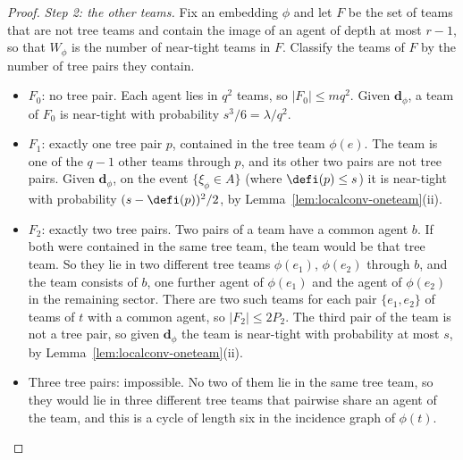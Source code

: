 \begin{proof}
\emph{Step 2: the other teams.} Fix an embedding $\phi$ and let $F$ be the set of teams that
are not tree teams and contain the image of an agent of depth at most $r-1$, so that
$W_\phi$ is the number of near-tight teams in $F$. Classify the teams of $F$ by the number of
tree pairs they contain.
\begin{itemize}
\item $F_0$: no tree pair. Each agent lies in $q^2$ teams, so $|F_0|\le mq^2$. Given
$\mathbf d_\phi$, a team of $F_0$ is near-tight with probability $s^3/6=\lambda/q^2$.
\item $F_1$: exactly one tree pair $p$, contained in the tree team $\phi(e)$. The team is one
of the $q-1$ other teams through $p$, and its other two pairs are not tree pairs. Given
$\mathbf d_\phi$, on the event $\{\xi_\phi\in A\}$ (where $\defi(p)\le s$) it is near-tight
with probability $(s-\defi(p))^2/2$, by Lemma~\ref{lem:localconv-oneteam}(ii).
\item $F_2$: exactly two tree pairs. Two pairs of a team have a common agent $b$. If both
were contained in the same tree team, the team would be that tree team. So they lie in two
different tree teams $\phi(e_1)$, $\phi(e_2)$ through $b$, and the team consists of $b$, one
further agent of $\phi(e_1)$ and the agent of $\phi(e_2)$ in the remaining sector. There are
two such teams for each pair $\{e_1,e_2\}$ of teams of $t$ with a common agent, so
$|F_2|\le2P_2$. The third pair of the team is not a tree pair, so given $\mathbf d_\phi$ the
team is near-tight with probability at most $s$, by Lemma~\ref{lem:localconv-oneteam}(ii).
\item Three tree pairs: impossible. No two of them lie in the same tree team, so they would
lie in three different tree teams that pairwise share an agent of the team, and this is a
cycle of length six in the incidence graph of $\phi(t)$.
\end{itemize}


\end{proof}

